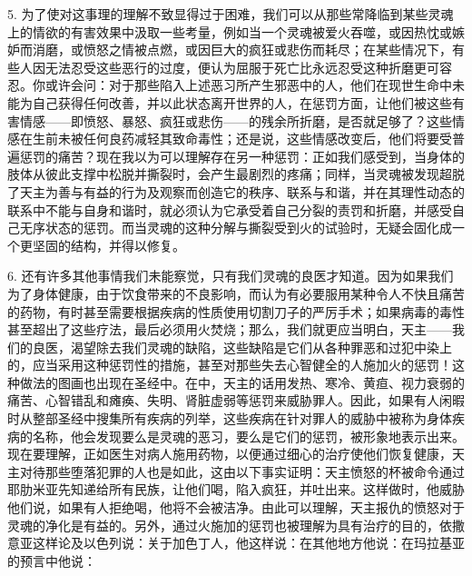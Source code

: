 5. 为了使对这事理的理解不致显得过于困难，我们可以从那些常降临到某些灵魂上的情欲的有害效果中汲取一些考量，例如当一个灵魂被爱火吞噬，或因热忱或嫉妒而消磨，或愤怒之情被点燃，或因巨大的疯狂或悲伤而耗尽；在某些情况下，有些人因无法忍受这些恶行的过度，便认为屈服于死亡比永远忍受这种折磨更可容忍。你或许会问：对于那些陷入上述恶习所产生邪恶中的人，他们在现世生命中未能为自己获得任何改善，并以此状态离开世界的人，在惩罚方面，让他们被这些有害情感——即愤怒、暴怒、疯狂或悲伤——的残余所折磨，是否就足够了？这些情感在生前未被任何良药减轻其致命毒性；还是说，这些情感改变后，他们将要受普遍惩罚的痛苦？现在我以为可以理解存在另一种惩罚：正如我们感受到，当身体的肢体从彼此支撑中松脱并撕裂时，会产生最剧烈的疼痛；同样，当灵魂被发现超脱了天主为善与有益的行为及观察而创造它的秩序、联系与和谐，并在其理性动态的联系中不能与自身和谐时，就必须认为它承受着自己分裂的责罚和折磨，并感受自己无序状态的惩罚。而当灵魂的这种分解与撕裂受到火的试验时，无疑会固化成一个更坚固的结构，并得以修复。\par

6. 还有许多其他事情我们未能察觉，只有我们灵魂的良医才知道。因为如果我们为了身体健康，由于饮食带来的不良影响，而认为有必要服用某种令人不快且痛苦的药物，有时甚至需要根据疾病的性质使用切割刀子的严厉手术；如果病毒的毒性甚至超出了这些疗法，最后必须用火焚烧；那么，我们就更应当明白，天主——我们的良医，渴望除去我们灵魂的缺陷，这些缺陷是它们从各种罪恶和过犯中染上的，应当采用这种惩罚性的措施，甚至对那些失去心智健全的人施加火的惩罚！这种做法的图画也出现在圣经中。在中，天主的话用发热、寒冷、黄疸、视力衰弱的痛苦、心智错乱和瘫痪、失明、肾脏虚弱等惩罚来威胁罪人。因此，如果有人闲暇时从整部圣经中搜集所有疾病的列举，这些疾病在针对罪人的威胁中被称为身体疾病的名称，他会发现要么是灵魂的恶习，要么是它们的惩罚，被形象地表示出来。现在要理解，正如医生对病人施用药物，以便通过细心的治疗使他们恢复健康，天主对待那些堕落犯罪的人也是如此，这由以下事实证明：天主愤怒的杯被命令通过耶肋米亚先知递给所有民族，让他们喝，陷入疯狂，并吐出来。这样做时，他威胁他们说，如果有人拒绝喝，他将不会被洁净。由此可以理解，天主报仇的愤怒对于灵魂的净化是有益的。另外，通过火施加的惩罚也被理解为具有治疗的目的，依撒意亚这样论及以色列说：关于加色丁人，他这样说：在其他地方他说：在玛拉基亚的预言中他说：\par

